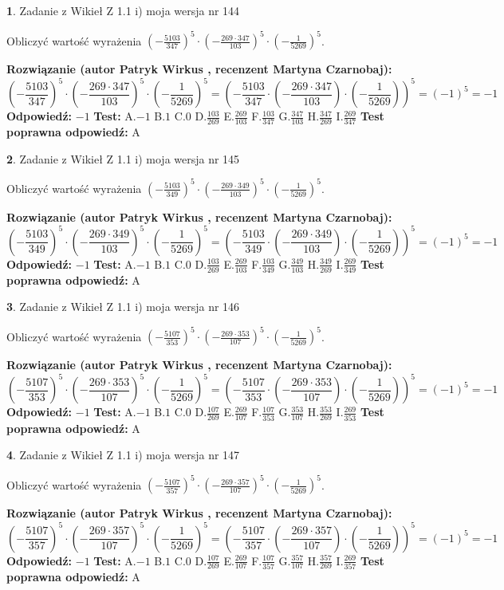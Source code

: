 \documentclass[12pt, a4paper]{article}
\theoremstyle{definition} %
\newtheorem{zad}{}
\newcommand{\zadStart}[1]{\begin{zad}#1\newline}
\newcommand{\zadStop}{\end{zad}}
\newcommand{\rozwStart}[2]{\noindent \textbf{Rozwiązanie (autor #1 , recenzent #2): }\newline}
\newcommand{\rozwStop}{\newline}
\newcommand{\odpStart}{\noindent \textbf{Odpowiedź:}\newline}
\newcommand{\odpStop}{\newline}
\newcommand{\testStart}{\noindent \textbf{Test:}\newline}
\newcommand{\testStop}{\newline}
\newcommand{\kluczStart}{\noindent \textbf{Test poprawna odpowiedź:}\newline}
\newcommand{\kluczStop}{\newline}
\begin{document}
\zadStart{Zadanie z Wikieł Z 1.1 i) moja wersja nr 144}

Obliczyć wartość wyrażenia $(-\frac{5103}{347})^{5} \cdot (-\frac{269 \cdot 347}{103})^{5} \cdot (-\frac{1}{5269})^{5}$.
\zadStop
\rozwStart{Patryk Wirkus}{Martyna Czarnobaj}
$$(-\frac{5103}{347})^{5} \cdot (-\frac{269 \cdot 347}{103})^{5} \cdot (-\frac{1}{5269})^{5} = (-\frac{5103}{347} \cdot (-\frac{269 \cdot 347}{103}) \cdot (-\frac{1}{5269}))^{5} = (-1)^{5} = -1$$
\rozwStop
\odpStart
$-1$
\odpStop
\testStart
A.$-1$ B.$1$ C.$0$ D.$\frac{103}{269}$ E.$\frac{269}{103}$
F.$\frac{103}{347}$ G.$\frac{347}{103}$
H.$\frac{347}{269}$
I.$\frac{269}{347}$
\testStop
\kluczStart
A
\kluczStop



\zadStart{Zadanie z Wikieł Z 1.1 i) moja wersja nr 145}

Obliczyć wartość wyrażenia $(-\frac{5103}{349})^{5} \cdot (-\frac{269 \cdot 349}{103})^{5} \cdot (-\frac{1}{5269})^{5}$.
\zadStop
\rozwStart{Patryk Wirkus}{Martyna Czarnobaj}
$$(-\frac{5103}{349})^{5} \cdot (-\frac{269 \cdot 349}{103})^{5} \cdot (-\frac{1}{5269})^{5} = (-\frac{5103}{349} \cdot (-\frac{269 \cdot 349}{103}) \cdot (-\frac{1}{5269}))^{5} = (-1)^{5} = -1$$
\rozwStop
\odpStart
$-1$
\odpStop
\testStart
A.$-1$ B.$1$ C.$0$ D.$\frac{103}{269}$ E.$\frac{269}{103}$
F.$\frac{103}{349}$ G.$\frac{349}{103}$
H.$\frac{349}{269}$
I.$\frac{269}{349}$
\testStop
\kluczStart
A
\kluczStop



\zadStart{Zadanie z Wikieł Z 1.1 i) moja wersja nr 146}

Obliczyć wartość wyrażenia $(-\frac{5107}{353})^{5} \cdot (-\frac{269 \cdot 353}{107})^{5} \cdot (-\frac{1}{5269})^{5}$.
\zadStop
\rozwStart{Patryk Wirkus}{Martyna Czarnobaj}
$$(-\frac{5107}{353})^{5} \cdot (-\frac{269 \cdot 353}{107})^{5} \cdot (-\frac{1}{5269})^{5} = (-\frac{5107}{353} \cdot (-\frac{269 \cdot 353}{107}) \cdot (-\frac{1}{5269}))^{5} = (-1)^{5} = -1$$
\rozwStop
\odpStart
$-1$
\odpStop
\testStart
A.$-1$ B.$1$ C.$0$ D.$\frac{107}{269}$ E.$\frac{269}{107}$
F.$\frac{107}{353}$ G.$\frac{353}{107}$
H.$\frac{353}{269}$
I.$\frac{269}{353}$
\testStop
\kluczStart
A
\kluczStop



\zadStart{Zadanie z Wikieł Z 1.1 i) moja wersja nr 147}

Obliczyć wartość wyrażenia $(-\frac{5107}{357})^{5} \cdot (-\frac{269 \cdot 357}{107})^{5} \cdot (-\frac{1}{5269})^{5}$.
\zadStop
\rozwStart{Patryk Wirkus}{Martyna Czarnobaj}
$$(-\frac{5107}{357})^{5} \cdot (-\frac{269 \cdot 357}{107})^{5} \cdot (-\frac{1}{5269})^{5} = (-\frac{5107}{357} \cdot (-\frac{269 \cdot 357}{107}) \cdot (-\frac{1}{5269}))^{5} = (-1)^{5} = -1$$
\rozwStop
\odpStart
$-1$
\odpStop
\testStart
A.$-1$ B.$1$ C.$0$ D.$\frac{107}{269}$ E.$\frac{269}{107}$
F.$\frac{107}{357}$ G.$\frac{357}{107}$
H.$\frac{357}{269}$
I.$\frac{269}{357}$
\testStop
\kluczStart
A
\kluczStop
\end{document}
